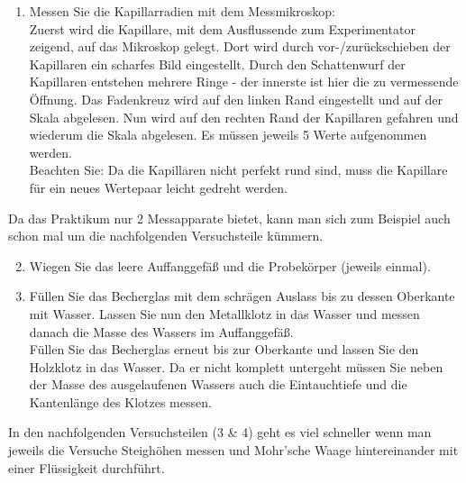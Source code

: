 \begin{enumerate}
%
 \item Messen Sie die Kapillarradien mit dem Messmikroskop: \\
 Zuerst wird die Kapillare, mit dem Ausflussende zum Experimentator zeigend, auf das Mikroskop gelegt. Dort wird durch vor-/zurückschieben der Kapillaren ein scharfes Bild eingestellt. Durch den  Schattenwurf der Kapillaren entstehen mehrere Ringe - der innerste ist hier die zu vermessende Öffnung. Das Fadenkreuz wird auf den linken Rand eingestellt und auf der Skala abgelesen. Nun wird auf den rechten Rand der Kapillaren gefahren und wiederum die Skala abgelesen. Es müssen jeweils 5 Werte aufgenommen werden.\\
 Beachten Sie: Da die Kapillaren nicht perfekt rund sind, muss die Kapillare für ein neues Wertepaar leicht gedreht werden.
\end{enumerate}
%
\begin{important}
	Da das Praktikum nur 2 Messapparate bietet, kann man sich zum Beispiel auch schon mal um die nachfolgenden Versuchsteile kümmern.
\end{important}
%
\begin{enumerate} \setcounter{enumi}{1}
 \item Wiegen Sie das leere Auffanggefäß und die Probekörper (jeweils einmal). 
 \item Füllen Sie das Becherglas mit dem schrägen Auslass bis zu dessen Oberkante mit Wasser. Lassen Sie nun den Metallklotz in das Wasser und messen danach die Masse des Wassers im Auffanggefäß. \\
 Füllen Sie das Becherglas erneut bis zur Oberkante und lassen Sie den Holzklotz in das Wasser. Da er nicht komplett untergeht müssen Sie neben der Masse des ausgelaufenen Wassers auch die Eintauchtiefe und die Kantenlänge des Klotzes messen.
\end{enumerate}
%
\begin{important}
	In den nachfolgenden Versuchsteilen (3 \& 4) geht es viel schneller wenn man jeweils die Versuche Steighöhen messen und Mohr'sche Waage hintereinander mit einer Flüssigkeit durchführt.
\end{important}

